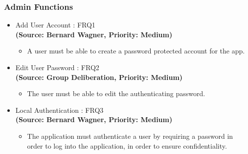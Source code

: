 \subsubsection{Admin Functions}
\begin{itemize}
\item{Add User Account : FRQ1}\\
\textbf{(Source: Bernard Wagner, Priority: Medium)}
\begin{itemize}
\item A user must be able to create a password protected account for the app.
\end{itemize}
\item{Edit User Password : FRQ2}\\
\textbf{(Source: Group Deliberation, Priority: Medium)}
\begin{itemize}
\item The user must be able to edit the authenticating password.
\end{itemize}
\item{Local Authentication : FRQ3}\\%
\textbf{(Source: Bernard Wagner, Priority: Medium)}
\begin{itemize}
\item The application must authenticate a user by requiring a password in order to log into the application, in order to ensure confidentiality.
\end{itemize}
\end{itemize}

